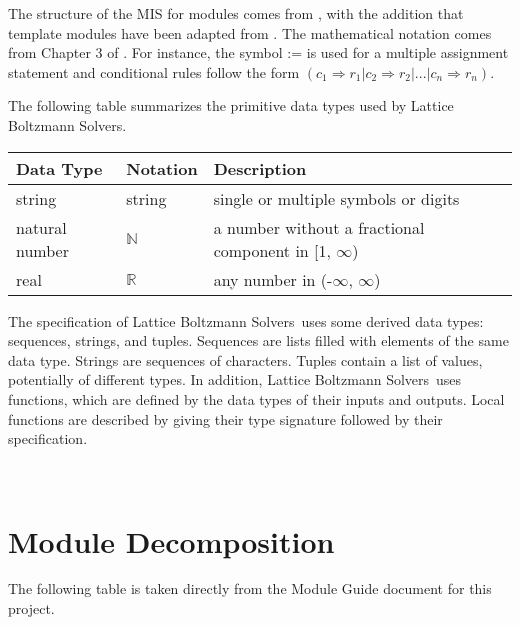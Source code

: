 \documentclass[12pt, titlepage]{article}
\newcommand{\famname}{Lattice Boltzmann Solvers}
\begin{document}
The structure of the MIS for modules comes from \citet{HoffmanAndStrooper1995},
with the addition that template modules have been adapted from
\cite{GhezziEtAl2003}.  The mathematical notation comes from Chapter 3 of
\citet{HoffmanAndStrooper1995}.  For instance, the symbol := is used for a
multiple assignment statement and conditional rules follow the form $(c_1
\Rightarrow r_1 | c_2 \Rightarrow r_2 | ... | c_n \Rightarrow r_n )$.

The following table summarizes the primitive data types used by \famname. 

\begin{center}
\renewcommand{\arraystretch}{1.2}
\noindent 
\begin{tabular}{l l p{7.5cm}} 
\toprule 
\textbf{Data Type} & \textbf{Notation} & \textbf{Description}\\ 
\midrule
string & string & single or multiple symbols or digits\\
natural number & $\mathbb{N}$ & a number without a fractional component in [1, $\infty$) \\
real & $\mathbb{R}$ & any number in (-$\infty$, $\infty$)\\
\bottomrule
\end{tabular} 
\end{center}

\noindent
The specification of \famname \ uses some derived data types: sequences, strings, and
tuples. Sequences are lists filled with elements of the same data type. Strings
are sequences of characters. Tuples contain a list of values, potentially of
different types. In addition, \famname \ uses functions, which
are defined by the data types of their inputs and outputs. Local functions are
described by giving their type signature followed by their specification.

~\newpage

\section{Module Decomposition}

The following table is taken directly from the Module Guide document for this project.
\end{document}
